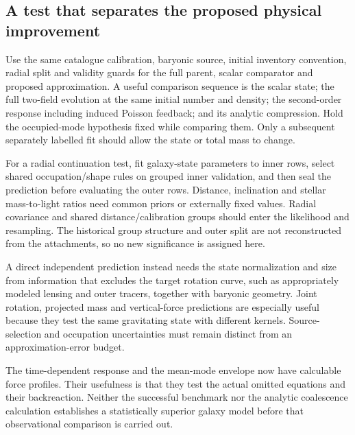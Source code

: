 \documentclass[11pt]{article}
\begin{document}
\subsection{A test that separates the proposed physical improvement}
Use the same catalogue calibration, baryonic source, initial inventory convention, radial split and validity guards for the full parent, scalar comparator and proposed approximation. A useful comparison sequence is the scalar state; the full two-field evolution at the same initial number and density; the second-order response including induced Poisson feedback; and its analytic compression. Hold the occupied-mode hypothesis fixed while comparing them. Only a subsequent separately labelled fit should allow the state or total mass to change.

For a radial continuation test, fit galaxy-state parameters to inner rows, select shared occupation/shape rules on grouped inner validation, and then seal the prediction before evaluating the outer rows. Distance, inclination and stellar mass-to-light ratios need common priors or externally fixed values. Radial covariance and shared distance/calibration groups should enter the likelihood and resampling. The historical group structure and outer split are not reconstructed from the attachments, so no new significance is assigned here.

A direct independent prediction instead needs the state normalization and size from information that excludes the target rotation curve, such as appropriately modeled lensing and outer tracers, together with baryonic geometry. Joint rotation, projected mass and vertical-force predictions are especially useful because they test the same gravitating state with different kernels. Source-selection and occupation uncertainties must remain distinct from an approximation-error budget.

The time-dependent response and the mean-mode envelope now have calculable force profiles. Their usefulness is that they test the actual omitted equations and their backreaction. Neither the successful benchmark nor the analytic coalescence calculation establishes a statistically superior galaxy model before that observational comparison is carried out.
\end{document}
